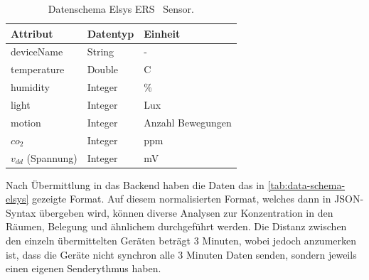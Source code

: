 \begin{table}[H]
\centering
\begin{tabular}{|l|l|l|}
\hline
Attribut    & Datentyp & Einheit           \\ \hline
deviceName  & String   & -                 \\ \hline
temperature & Double   & \textdegree{}C     \\ \hline
humidity    & Integer  & \%                \\ \hline
light       & Integer  & Lux               \\ \hline
motion      & Integer  & Anzahl Bewegungen \\ \hline
$co_2$        & Integer  & ppm               \\ \hline
$v_{dd}$ (Spannung)         & Integer  & mV                \\ \hline
\end{tabular}
\caption[Datenschema Elsys ERS \coo{}~Sensor]{Datenschema Elsys ERS \coo{}~Sensor.\footnotemark}
\label{tab:data-schema-elsys}
\end{table}
Nach Übermittlung in das Backend haben die Daten das in \autoref{tab:data-schema-elsys} gezeigte Format. Auf diesem normalisierten Format, welches dann in \ac{JSON}-Syntax übergeben wird, können diverse Analysen zur \coo{} Konzentration in den Räumen, Belegung und ähnlichem durchgeführt werden. Die Distanz zwischen den einzeln übermittelten Geräten beträgt 3 Minuten, wobei jedoch anzumerken ist, dass die Geräte nicht synchron alle 3 Minuten Daten senden, sondern jeweils einen eigenen Senderythmus haben.


